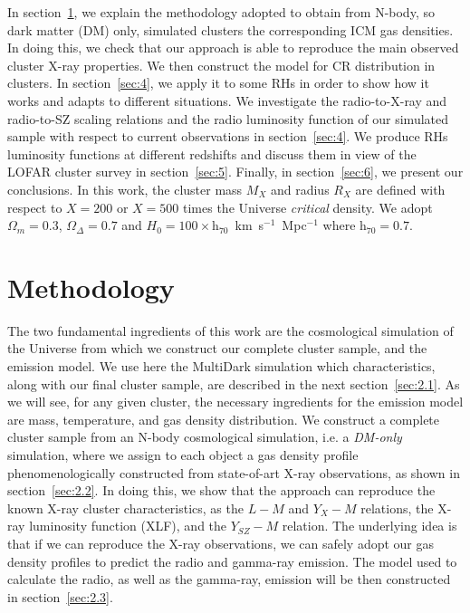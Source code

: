 \documentclass[traditabstract]{aa}
\newcommand{\rmn}{\mathrm}
\begin{document}
In section~\ref{sec:2}, we explain the methodology adopted to obtain from N-body, so dark matter (DM) only, simulated clusters the corresponding ICM gas densities.
In doing this, we check that  our approach is able to reproduce the main observed cluster X-ray properties. We then construct the model for CR distribution 
in clusters. In section~\ref{sec:4}, we apply it to some RHs in order to show how it works and adapts to different situations. We investigate the radio-to-X-ray and radio-to-SZ scaling relations and the radio luminosity function of our simulated sample with respect to current observations in section~\ref{sec:4}. We produce RHs luminosity functions at different redshifts and discuss them in view of the LOFAR cluster survey in section~\ref{sec:5}. Finally, in section~\ref{sec:6}, we present our conclusions.
In this work, the cluster mass $M_{X}$ and radius $R_{X}$ are defined with respect to $X=200$ or $X=500$ times the Universe \emph{critical} density. We adopt $\Omega_{m}=0.3$, $\Omega_{\Delta}=0.7$ and $H_0 = 100 \times \rmn{h}_{\rmn{70}}$~km~s$^{-1}$~Mpc$^{-1}$ where $\rmn{h}_{70} = 0.7$. 

\section{Methodology}
\label{sec:2}
The two fundamental ingredients of this work are the cosmological simulation of the Universe from which we construct our complete cluster 
sample, and the emission model. We use here the MultiDark simulation which characteristics, along with our final cluster sample, 
are described in the next section~\ref{sec:2.1}. 
%
As we will see, for any given cluster, the necessary ingredients for the emission model are mass, temperature, and gas density 
distribution. We construct a complete cluster sample from an N-body cosmological simulation, i.e. a \emph{DM-only} 
simulation, where we assign to each object a gas density profile phenomenologically constructed from state-of-art 
X-ray observations, as shown in section~\ref{sec:2.2}. In doing this, we show that the approach can reproduce the known 
X-ray cluster characteristics, as the $L- M$ and $Y_{X}-M$ relations, the X-ray luminosity function (XLF), and the $Y_{SZ}-M$ relation. 
The underlying idea is that if we can reproduce the X-ray observations, we can safely adopt our gas density profiles to predict the radio 
and gamma-ray emission. 
%
The model used to calculate the radio, as well as the gamma-ray, emission will be then constructed in section~\ref{sec:2.3}.
\end{document}
